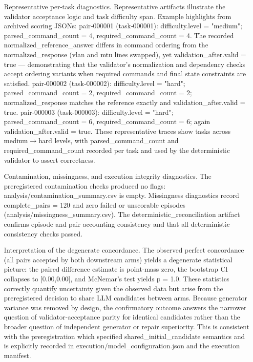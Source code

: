 \documentclass[conference]{IEEEtran}
\begin{document}
Representative per‑task diagnostics. Representative artifacts illustrate the validator acceptance logic and task difficulty span. Example highlights from archived scoring JSONs:
\textbullet{} pair‑000001 (task‑000001): difficulty.level = "medium"; parsed\_command\_count = 4, required\_command\_count = 4. The recorded normalized\_reference\_answer differs in command ordering from the normalized\_response (vlan and mtu lines swapped), yet validation\_after.valid = true --- demonstrating that the validator's normalization and dependency checks accept ordering variants when required commands and final state constraints are satisfied.
\textbullet{} pair‑000002 (task‑000002): difficulty.level = "hard"; parsed\_command\_count = 2, required\_command\_count = 2; normalized\_response matches the reference exactly and validation\_after.valid = true.
\textbullet{} pair‑000003 (task‑000003): difficulty.level = "hard"; parsed\_command\_count = 6, required\_command\_count = 6; again validation\_after.valid = true.
These representative traces show tasks across medium\ensuremath{\rightarrow}hard levels, with parsed\_command\_count and required\_command\_count recorded per task and used by the deterministic validator to assert correctness.

Contamination, missingness, and execution integrity diagnostics. The preregistered contamination checks produced no flags: analysis/contamination\_summary.csv is empty. Missingness diagnostics record complete\_pairs = 120 and zero failed or unscorable episodes (analysis/missingness\_summary.csv). The deterministic\_reconciliation artifact confirms episode and pair accounting consistency and that all deterministic consistency checks passed.

Interpretation of the degenerate concordance. The observed perfect concordance (all pairs accepted by both downstream arms) yields a degenerate statistical picture: the paired difference estimate is point‑mass zero, the bootstrap CI collapses to [0.00,0.00], and McNemar's test yields p = 1.0. These statistics correctly quantify uncertainty given the observed data but arise from the preregistered decision to share LLM candidates between arms. Because generator variance was removed by design, the confirmatory outcome answers the narrower question of validator‑acceptance parity for identical candidates rather than the broader question of independent generator or repair superiority. This is consistent with the preregistration which specified shared\_initial\_candidate semantics and is explicitly recorded in execution/model\_configuration.json and the execution manifest.
\end{document}
